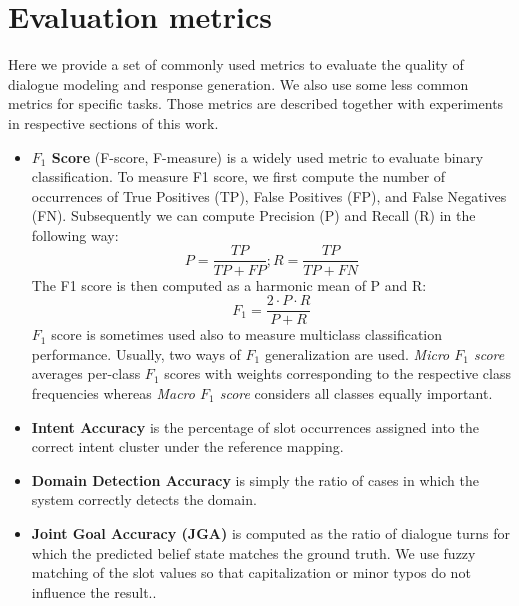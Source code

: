 \section{Evaluation metrics}
\label
{02:sec:eval_metrics}
Here we provide a set of commonly used metrics to evaluate the quality of dialogue modeling and response generation.
We also use some less common metrics for specific tasks.
Those metrics are described together with experiments in respective sections of this work.
\begin{itemize}
    \item \textbf{$F_1$ Score} (F-score, F-measure) is a widely used metric to evaluate binary classification.
    To measure F1 score, we first compute the number of occurrences of True Positives (TP), False Positives (FP), and False Negatives (FN).
    Subsequently we can compute Precision (P) and Recall (R) in the following way:
    \begin{equation*}
        P = \frac{TP}{TP + FP}; R = \frac{TP}{TP + FN}
    \end{equation*}
    The F1 score is then computed as a harmonic mean of P and R:
    \begin{equation*}
        F_1 = \frac{2\cdot P \cdot R}{P + R}
    \end{equation*}
    $F_1$ score is sometimes used also to measure multiclass classification performance.
    Usually, two ways of $F_1$ generalization are used. \emph{Micro $F_1$ score} averages per-class $F_1$ scores with weights corresponding to the respective class frequencies whereas \emph{Macro $F_1$ score} considers all classes equally important.
    \item \textbf{Intent Accuracy} is the percentage of slot occurrences assigned into the correct intent cluster under the reference mapping.
    \item \textbf{Domain Detection Accuracy} is simply the ratio of cases in which the system correctly detects the domain.
    \item \textbf{Joint Goal Accuracy (JGA)} is computed as the ratio of dialogue turns for which the predicted belief state matches the ground truth.
    We use fuzzy matching of the slot values so that capitalization or minor typos do not influence the result.\cite{mrkvsic2016neural}.
    

\end{itemize}
